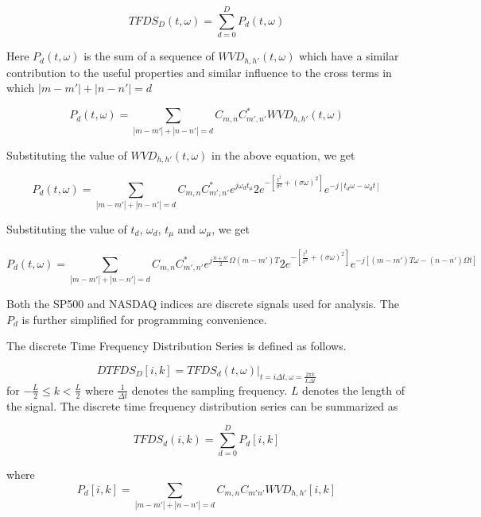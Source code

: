 \begin{equation}
TFDS_D(t,\omega) = \sum_{d=0}^{D} P_d(t,\omega)
\end{equation}

Here $P_d(t,\omega)$ is the sum of a sequence of $WVD_{h,h'}(t,\omega)$ which have a similar contribution to the useful properties and similar influence to the cross terms in which $|m-m'|+|n-n'|=d$

\begin{equation}
P_d(t,\omega) = \sum_{|m-m'|+|n-n'|=d} C_{m,n}C^{*}_{m',n'} WVD_{h,h'}(t,\omega)
\end{equation}

Substituting the value of $WVD_{h,h'}(t,\omega)$ in the above equation, we get

\begin{equation}
P_d(t,\omega) = \sum_{|m-m'|+|n-n'|=d} C_{m,n}C^{*}_{m',n'} e^{j\omega_d t_\mu} 2e^{-[\frac{t^2}{\sigma^2}+(\sigma \omega)^2]} e^{-j[t_d\omega - \omega_d t]}
\end{equation}

Substituting the value of $t_d$, $\omega_d$, $t_\mu$ and $\omega_\mu$, we get

\begin{equation}
P_d(t,\omega) = \sum_{|m-m'|+|n-n'|=d} C_{m,n}C^{*}_{m',n'} e^{j\frac{n+n'}{2}\Omega(m-m')T} 2e^{-[\frac{t^2}{\sigma^2}+(\sigma \omega)^2]} e^{-j[(m-m')T\omega - (n-n')\Omega t]}
\end{equation}

Both the SP500 and NASDAQ indices are discrete signals used for analysis. The $P_d$ is further simplified for programming convenience. 

The discrete Time Frequency Distribution Series is defined as follows. 

\begin{equation}
DTFDS_D[i,k] = TFDS_d(t,\omega) |_{ t = i\Delta t, \omega = \frac{2\pi k}{L\Delta t}}
\end{equation}
for $-\frac{L}{2} \leq k < \frac{L}{2}$ where $\frac{1}{\Delta t}$ denotes the sampling frequency. $L$ denotes the length of the signal. The discrete time frequency distribution series can be summarized as 

\begin{equation}
 TFDS_d(i,k) = \sum_{d=0}^{D} P_d[i,k]
\end{equation}

where 
\begin{equation}
 P_d[i,k] = \sum_{|m-m'|+|n-n'|=d} C_{m,n}C_{m'n'} WVD_{h,h'}[i,k]
\end{equation}


